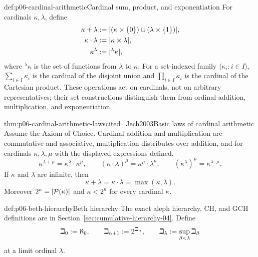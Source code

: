\begin{hbdefinition}{def:p06-cardinal-arithmetic}{Cardinal sum, product, and exponentiation}
For cardinals \(\kappa,\lambda\), define
\[
\begin{aligned}
  \kappa+\lambda
    &\mathrel{:=}\lvert(\kappa\times\{0\})\cup(\lambda\times\{1\})\rvert,\\
  \kappa\cdot\lambda
    &\mathrel{:=}\lvert\kappa\times\lambda\rvert,\\
  \kappa^\lambda
    &\mathrel{:=}\lvert{}^{\lambda}\kappa\rvert,
\end{aligned}
\]
where \({}^{\lambda}\kappa\) is the set of functions from \(\lambda\) to
\(\kappa\).  For a set-indexed family \(\langle\kappa_i:i\in I\rangle\),
\(\sum_{i\in I}\kappa_i\) is the cardinal of the disjoint union and
\(\prod_{i\in I}\kappa_i\) is the cardinal of the Cartesian product.
These operations act on cardinals, not on arbitrary representatives; their
set constructions distinguish them from ordinal addition, multiplication,
and exponentiation.
\end{hbdefinition}

\begin{hbtheorem}{thm:p06-cardinal-arithmetic-laws}{cited=Jech2003}{Basic laws of cardinal arithmetic}
Assume the Axiom of Choice.  Cardinal addition and multiplication are
commutative and associative, multiplication distributes over addition, and
for cardinals \(\kappa,\lambda,\mu\) with the displayed expressions defined,
\[
  \kappa^{\lambda+\mu}=\kappa^\lambda\cdot\kappa^\mu,
  \qquad
  (\kappa\cdot\lambda)^\mu=\kappa^\mu\cdot\lambda^\mu,
  \qquad
  (\kappa^\lambda)^\mu=\kappa^{\lambda\cdot\mu}.
\]
If \(\kappa\) and \(\lambda\) are infinite, then
\[
  \kappa+\lambda=\kappa\cdot\lambda=\max(\kappa,\lambda).
\]
Moreover \(2^\kappa=\lvert\mathcal P(\kappa)\rvert\) and
\(\kappa<2^\kappa\) for every cardinal \(\kappa\).
\end{hbtheorem}


\begin{hbdefinition}{def:p06-beth-hierarchy}{Beth hierarchy}
The exact aleph hierarchy, CH, and GCH definitions are in
Section~\ref{sec:cumulative-hierarchy-04}.  Define
\[
  \beth_0\mathrel{:=}\aleph_0,\qquad
  \beth_{\alpha+1}\mathrel{:=}2^{\beth_\alpha},\qquad
  \beth_\lambda\mathrel{:=}\sup_{\beta<\lambda}\beth_\beta
\]
at a limit ordinal \(\lambda\).
\end{hbdefinition}


